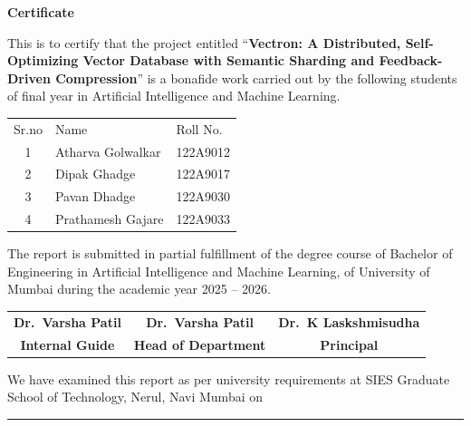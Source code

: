 \begin{center}
    \fontsize{25pt}{18pt} {\textbf{Certificate}}
\end{center}

\vspace{0.5 in}

\noindent This is to certify that the project entitled “\textbf{Vectron: A Distributed, Self-Optimizing Vector Database with Semantic Sharding and Feedback-Driven Compression}” is a bonafide work carried out by the following students of final year in Artificial Intelligence and Machine Learning.

\vspace{25pt}

\noindent \begin{tabular}{cll}
    Sr.no & Name & \hspace{15pt}Roll No. \\
    1 & Atharva Golwalkar & \hspace{15pt}122A9012\\ 
    2 & Dipak Ghadge& \hspace{15pt}122A9017\\
    3 & Pavan Dhadge& \hspace{15pt}122A9030\\
    4 & Prathamesh Gajare& \hspace{15pt}122A9033\\
    \end{tabular}

\vspace{25pt}

\noindent The report is submitted in partial fulfillment of the degree course of Bachelor of Engineering in Artificial Intelligence and Machine Learning, of University of Mumbai during the academic year 2025 – 2026.

\vspace{1.5 in}

\noindent \begin{tabular}{ccc}
    \textbf{Dr.\ Varsha Patil} & \hspace{0.5 in}\textbf{Dr.\ Varsha Patil}& \hspace{0.5 in}\textbf{Dr.\ K Laskshmisudha} 
    \\
    \textbf{Internal Guide} & \hspace{0.5 in}\textbf{Head of Department} & \hspace{0.5 in}\textbf{Principal}
\end{tabular}

\vspace{25pt}

\noindent We have examined this report as per university requirements at SIES Graduate School of Technology, Nerul, Navi Mumbai on \rule{4cm}{1sp}
